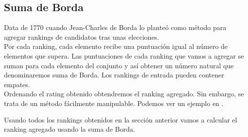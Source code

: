 \subsection{Suma de Borda}
Data de 1770 cuando Jean-Charles de Borda lo planteó como método para agregar rankings de candidatos tras unas elecciones.\\

Por cada ranking, cada elemento recibe una puntuación igual al número de elementos que supera. Las puntuaciones de cada ranking que vamos a agregar se suman para cada elemento del conjunto y así obtener un número natural que denominaremos suma de Borda. Los rankings de entrada pueden contener empates.\\

Ordenando el rating obtenido obtendremos el ranking agregado. Sin embargo, se trata de un método fácilmente manipulable. Podemos ver un ejemplo en \cite[pág 854]{refborda}.

\newpage

\begin{ejem} Usando todos los rankings obtenidos en la sección anterior vamos a calcular el ranking agregado usando la suma de Borda.
\end{ejem}

